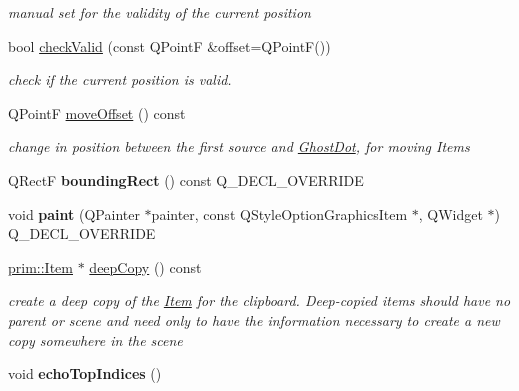 \begin{DoxyCompactItemize}
\begin{DoxyCompactList}\small\item\em manual set for the validity of the current position \end{DoxyCompactList}\item 
bool \hyperlink{classprim_1_1Ghost_a353ab6dfe05cfff99aebab59207cb95d}{check\+Valid} (const Q\+PointF \&offset=Q\+PointF())\hypertarget{classprim_1_1Ghost_a353ab6dfe05cfff99aebab59207cb95d}{}\label{classprim_1_1Ghost_a353ab6dfe05cfff99aebab59207cb95d}

\begin{DoxyCompactList}\small\item\em check if the current position is valid. \end{DoxyCompactList}\item 
Q\+PointF \hyperlink{classprim_1_1Ghost_aae476432c09d4c3b3a8c8dcdb8a94c94}{move\+Offset} () const \hypertarget{classprim_1_1Ghost_aae476432c09d4c3b3a8c8dcdb8a94c94}{}\label{classprim_1_1Ghost_aae476432c09d4c3b3a8c8dcdb8a94c94}

\begin{DoxyCompactList}\small\item\em change in position between the first source and \hyperlink{classprim_1_1GhostDot}{Ghost\+Dot}, for moving Items \end{DoxyCompactList}\item 
Q\+RectF {\bfseries bounding\+Rect} () const Q\+\_\+\+D\+E\+C\+L\+\_\+\+O\+V\+E\+R\+R\+I\+DE\hypertarget{classprim_1_1Ghost_a67cf6c0546c09e90f86107f8c9b6c548}{}\label{classprim_1_1Ghost_a67cf6c0546c09e90f86107f8c9b6c548}

\item 
void {\bfseries paint} (Q\+Painter $\ast$painter, const Q\+Style\+Option\+Graphics\+Item $\ast$, Q\+Widget $\ast$) Q\+\_\+\+D\+E\+C\+L\+\_\+\+O\+V\+E\+R\+R\+I\+DE\hypertarget{classprim_1_1Ghost_ae9a5e4b678c702be051a96060e80082c}{}\label{classprim_1_1Ghost_ae9a5e4b678c702be051a96060e80082c}

\item 
\hyperlink{classprim_1_1Item}{prim\+::\+Item} $\ast$ \hyperlink{classprim_1_1Ghost_a93ee73c97062828642eafdd64d6211de}{deep\+Copy} () const \hypertarget{classprim_1_1Ghost_a93ee73c97062828642eafdd64d6211de}{}\label{classprim_1_1Ghost_a93ee73c97062828642eafdd64d6211de}

\begin{DoxyCompactList}\small\item\em create a deep copy of the \hyperlink{classprim_1_1Item}{Item} for the clipboard. Deep-\/copied items should have no parent or scene and need only to have the information necessary to create a new copy somewhere in the scene \end{DoxyCompactList}\item 
void {\bfseries echo\+Top\+Indices} ()\hypertarget{classprim_1_1Ghost_a9df8e28afe11ef1355672ba2c834c267}{}\label{classprim_1_1Ghost_a9df8e28afe11ef1355672ba2c834c267}


\end{DoxyCompactItemize}
